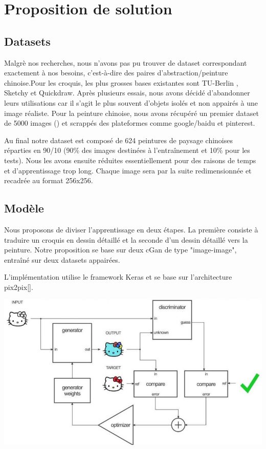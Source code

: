 \documentclass[a4paper, 12pt]{report}
\begin{document}
\chapter{Proposition de solution}



\section{Datasets}

Malgrè nos recherches, nous n'avons pas pu trouver de dataset correspondant exactement à nos besoins, c'est-à-dire des paires d'abstraction/peinture chinoise.Pour les croquis, les plus grosses bases existantes sont TU-Berlin \cite{eitz2012hdhso}, Sketchy \cite{sketchy2016} et Quickdraw. Après plusieurs essais, nous avons décidé d'abandonner leurs utilisations car il s'agit le plus souvent d'objets isolés et non appairés à une image réaliste. Pour la peinture chinoise, nous avons récupéré un premier dataset de 5000 images (\cite{ychen93}) et scrappés des plateformes comme google/baidu et pinterest. 


Au final notre dataset est composé de 624 peintures de paysage chinoises réparties en 90/10 (90\% des images destinées à l'entraînement et 10\% pour les tests). Nous les avons ensuite réduites essentiellement pour des raisons de temps et d'apprentissage trop long. Chaque image sera par la suite redimensionnée et recadrée au format 256x256.


\section{Modèle}
Nous proposons de diviser l'apprentissage en deux étapes. La première consiste à traduire un croquis en dessin détaillé et la seconde d'un dessin détaillé vers la peinture. Notre proposition se base sur deux cGan de type "image-image", entraîné sur deux datasets appairées.


L'implémentation utilise le framework Keras et se base sur l'architecture pix2pix[].

\begin{center}
  \centering
    \includegraphics[width=0.8\linewidth]{images/pix2pix.jpg}
\end{center}
\end{document}
